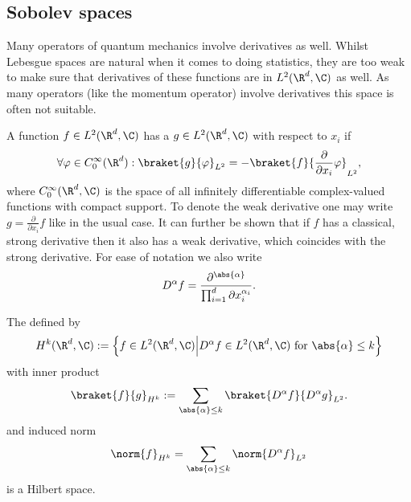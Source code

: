 \subsection{Sobolev spaces}
Many operators of quantum mechanics involve derivatives as well.
Whilst Lebesgue spaces are natural when it comes to doing statistics,
they are too weak to make sure
that derivatives of these functions are in $L^2(\R^d, \C)$ as well.
As many \QM operators (like the momentum operator) involve
derivatives this space is often not suitable.

\begin{defn}
	A function $f \in L^2(\R^d, \C)$ has a 
	$g \in L^2(\R^d, \C)$ with respect to $x_i$ if
	\[ \forall \varphi \in C^\infty_0(\R^d): \braket{g}{\varphi}_{L^2} = - \braket{f}{\frac{\partial}{\partial x_i}\varphi}_{L^2}, \]
	where $C^\infty_0(\R^d, \C)$ is the space of all
	infinitely differentiable complex-valued functions with compact support.
	To denote the weak derivative
	one may write $g = \frac{\partial}{\partial x_i} f$ like in the usual case.
	It can further be shown that if $f$ has a classical, strong derivative
	then it also has a weak derivative, which coincides with the strong derivative.
	For ease of notation we also write
	\[ D^\alpha f = \frac{\partial^{\abs{\alpha}}}{ \prod_{i=1}^d \partial x_i^{\alpha_i} }. \]
\end{defn}

\begin{defn}
	The  defined by
	\begin{equation}
		H^k(\R^d, \C) := \left\{ f \in L^2(\R^d, \C) \middle| D^\alpha f \in L^2(\R^d, \C) \text{ for $\abs{\alpha} \le k$} \right\}
		\label{eqn:defSobolev}
	\end{equation}
	with inner product
	\begin{equation}
	\braket{f}{g}_{H^k} := \sum_{\abs{\alpha} \le k} \braket{D^\alpha f}{D^\alpha g}_{L^2}.
		\label{eqn:defSobolevInnProd}
	\end{equation}
	and induced norm
	\begin{equation}
		\norm{f}_{H^k} = \sum_{\abs{\alpha} \le k} \norm{D^\alpha f}_{L^2}
		\label{eqn:defSobolevNorm}
	\end{equation}
	is a Hilbert space.
\end{defn}

